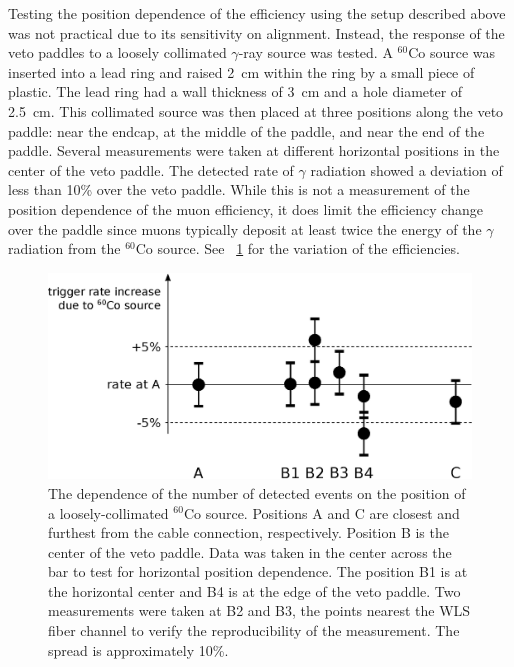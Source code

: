 Testing the position dependence of the efficiency using the setup described above was not practical due to its sensitivity on alignment.  Instead, the response of the veto paddles to a loosely collimated $\gamma$-ray source was tested.  A $^{60}$Co source was inserted into a lead ring and raised 2~cm within the ring by a small piece of plastic.  The lead ring had a wall thickness of 3~cm and a hole diameter of 2.5~cm.  This collimated source was then placed at three positions along the veto paddle: near the endcap, at the middle of the paddle, and near the end of the paddle.  Several measurements were taken at different horizontal positions in the center of the veto paddle. The detected rate of $\gamma$ radiation showed a deviation of less than 10\% over the veto paddle.  While this is not a measurement of the position dependence of the muon efficiency, it does limit the efficiency change over the paddle since muons typically deposit at least twice the energy of the $\gamma$ radiation from the $^{60}$Co source.  See {\fig}~\ref{fig:positionDependence} for the variation of the efficiencies.
\begin{figure}[!htbp]
\centering
\includegraphics[width=1.0\textwidth]{figures/efficiency_positionDependence.eps}
\caption{The dependence of the number of detected events on the position of a loosely-collimated $^{60}$Co source.  Positions A and C are closest and furthest from the cable connection, respectively.  Position B is the center of the veto paddle.  Data was taken in the center across the bar to test for horizontal position dependence.  The position B1 is at the horizontal center and B4 is at the edge of the veto paddle.  Two measurements were taken at B2 and B3, the points nearest the WLS fiber channel to verify the reproducibility of the measurement.  The spread is approximately 10\%.}
\label{fig:positionDependence}
\end{figure}


